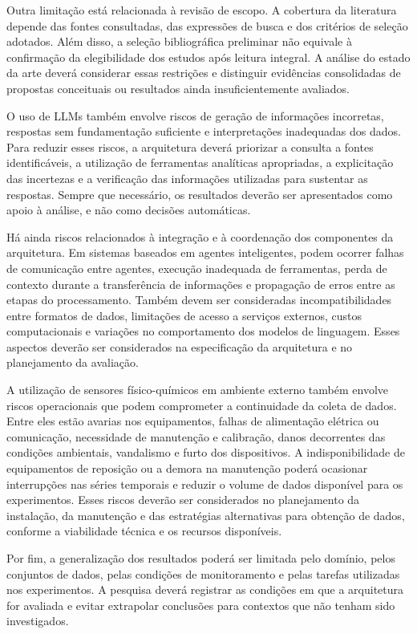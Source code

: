 Outra limitação está relacionada à revisão de escopo. A cobertura da literatura depende das fontes consultadas, das expressões de busca e dos critérios de seleção adotados. Além disso, a seleção bibliográfica preliminar não equivale à confirmação da elegibilidade dos estudos após leitura integral. A análise do estado da arte deverá considerar essas restrições e distinguir evidências consolidadas de propostas conceituais ou resultados ainda insuficientemente avaliados.

O uso de LLMs também envolve riscos de geração de informações incorretas, respostas sem fundamentação suficiente e interpretações inadequadas dos dados. Para reduzir esses riscos, a arquitetura deverá priorizar a consulta a fontes identificáveis, a utilização de ferramentas analíticas apropriadas, a explicitação das incertezas e a verificação das informações utilizadas para sustentar as respostas. Sempre que necessário, os resultados deverão ser apresentados como apoio à análise, e não como decisões automáticas.

Há ainda riscos relacionados à integração e à coordenação dos componentes da arquitetura. Em sistemas baseados em agentes inteligentes, podem ocorrer falhas de comunicação entre agentes, execução inadequada de ferramentas, perda de contexto durante a transferência de informações e propagação de erros entre as etapas do processamento. Também devem ser consideradas incompatibilidades entre formatos de dados, limitações de acesso a serviços externos, custos computacionais e variações no comportamento dos modelos de linguagem. Esses aspectos deverão ser considerados na especificação da arquitetura e no planejamento da avaliação.

A utilização de sensores físico-químicos em ambiente externo também envolve riscos operacionais que podem comprometer a continuidade da coleta de dados. Entre eles estão avarias nos equipamentos, falhas de alimentação elétrica ou comunicação, necessidade de manutenção e calibração, danos decorrentes das condições ambientais, vandalismo e furto dos dispositivos. A indisponibilidade de equipamentos de reposição ou a demora na manutenção poderá ocasionar interrupções nas séries temporais e reduzir o volume de dados disponível para os experimentos. Esses riscos deverão ser considerados no planejamento da instalação, da manutenção e das estratégias alternativas para obtenção de dados, conforme a viabilidade técnica e os recursos disponíveis.

Por fim, a generalização dos resultados poderá ser limitada pelo domínio, pelos conjuntos de dados, pelas condições de monitoramento e pelas tarefas utilizadas nos experimentos. A pesquisa deverá registrar as condições em que a arquitetura for avaliada e evitar extrapolar conclusões para contextos que não tenham sido investigados.

